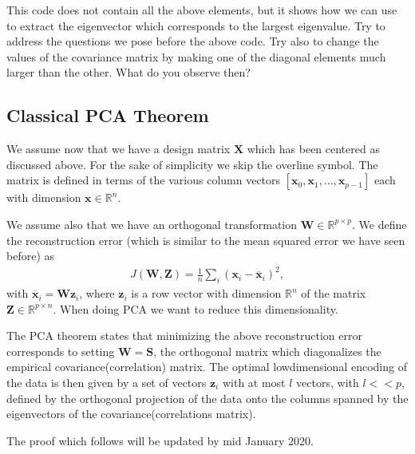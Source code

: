 \documentclass[letterpaper,10pt,english]{sphinxmanual}
\begin{document}
This code does not contain all the above elements, but it shows how we can use  to extract the eigenvector which corresponds to the largest eigenvalue. Try to address the questions we pose before the above code.  Try also to change the values of the covariance matrix by making one of the diagonal elements much larger than the other. What do you observe then?


\subsection{Classical PCA Theorem}
\label{\detokenize{chapter8:classical-pca-theorem}}
We assume now that we have a design matrix \(\boldsymbol{X}\) which has been
centered as discussed above. For the sake of simplicity we skip the
overline symbol. The matrix is defined in terms of the various column
vectors \([\boldsymbol{x}_0,\boldsymbol{x}_1,\dots, \boldsymbol{x}_{p-1}]\) each with dimension
\(\boldsymbol{x}\in {\mathbb{R}}^{n}\).

We assume also that we have an orthogonal transformation \(\boldsymbol{W}\in {\mathbb{R}}^{p\times p}\).  We define the reconstruction error (which is similar to the mean squared error we have seen before) as
\begin{equation*}
\begin{split}
J(\boldsymbol{W},\boldsymbol{Z}) = \frac{1}{n}\sum_i (\boldsymbol{x}_i - \overline{\boldsymbol{x}}_i)^2,
\end{split}
\end{equation*}
with \(\overline{\boldsymbol{x}}_i = \boldsymbol{W}\boldsymbol{z}_i\), where \(\boldsymbol{z}_i\) is a row vector with dimension \({\mathbb{R}}^{n}\) of the matrix
\(\boldsymbol{Z}\in{\mathbb{R}}^{p\times n}\).  When doing PCA we want to reduce this dimensionality.

The PCA theorem states that minimizing the above reconstruction error
corresponds to setting \(\boldsymbol{W}=\boldsymbol{S}\), the orthogonal matrix which
diagonalizes the empirical covariance(correlation) matrix. The optimal
low\sphinxhyphen{}dimensional encoding of the data is then given by a set of vectors
\(\boldsymbol{z}_i\) with at most \(l\) vectors, with \(l << p\), defined by the
orthogonal projection of the data onto the columns spanned by the
eigenvectors of the covariance(correlations matrix).

The proof which follows will be updated by mid January 2020.
\end{document}
